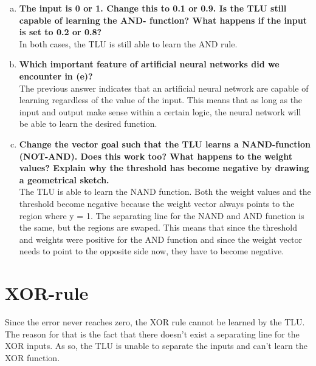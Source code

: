 \documentclass{article}
\begin{document}
\begin{enumerate}[a)]
\item \textbf{The input is 0 or 1. Change this to 0.1 or 0.9. Is the TLU still capable of learning the AND- function? What happens if the input is set to 0.2 or 0.8?
}\\ 
In both cases, the TLU is still able to learn the AND rule. \\

\item \textbf{
Which important feature of artificial neural networks did we encounter in (e)?
}\\ 
The previous answer indicates that an artificial neural network are capable of learning regardless of the value of the input. This means that as long as the input and output make sense within a certain logic, the neural network will be able to learn the desired function. \\

\item \textbf{Change the vector goal such that the TLU learns a NAND-function (NOT-AND). Does this work too? What happens to the weight values? Explain why the threshold has become negative by drawing a geometrical sketch.}\\ 
The TLU is able to learn the NAND function. Both the weight values and the threshold become negative because the weight vector always points to the region where y = 1. The separating line for the NAND and AND function is the same, but the regions are swaped. This means that since the threshold and weights were positive for the AND function and since the weight vector needs to point to the opposite side now, they have to become negative. \\
\end{enumerate}

\pagebreak

\section{XOR-rule}
Since the error never reaches zero, the XOR rule cannot be learned by the TLU. The reason for that is the fact that there doesn't exist a separating line for the XOR inputs. As so, the TLU is unable to separate the inputs and can't learn the XOR function. \\
\end{document}
